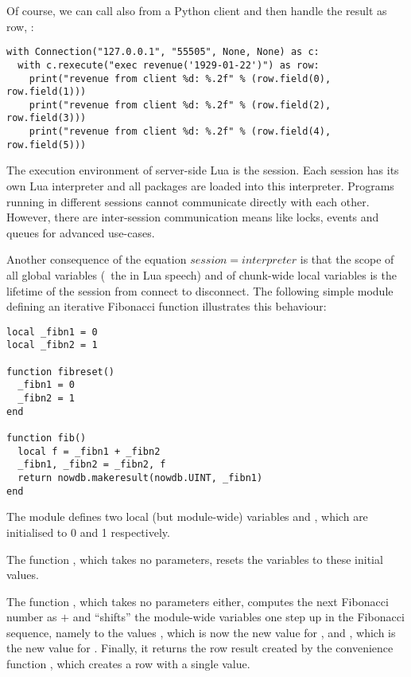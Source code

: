 \begin{minipage}{\textwidth}
Of course, we can call 
also from a Python client and then handle
the result as row, \eg:

\begin{python}
\begin{lstlisting}
with Connection("127.0.0.1", "55505", None, None) as c:
  with c.rexecute("exec revenue('1929-01-22')") as row:
    print("revenue from client %d: %.2f" % (row.field(0), row.field(1)))
    print("revenue from client %d: %.2f" % (row.field(2), row.field(3)))
    print("revenue from client %d: %.2f" % (row.field(4), row.field(5)))
\end{lstlisting}
\end{python}
\end{minipage}

The execution environment of server-side Lua
is the session. Each session has its own
Lua interpreter and all packages are loaded
into this interpreter. Programs running
in different sessions cannot communicate
directly with each other.
However, there are inter-session
communication means like locks, events and
queues for advanced use-cases.

Another consequence of the equation
$session = interpreter$ is that the scope
of all global variables (\ie\ the 
in Lua speech) and of chunk-wide local
variables is the lifetime of the session
from connect to disconnect.
The following simple module defining an iterative
Fibonacci function illustrates this behaviour:

\begin{lua}
\begin{lstlisting}
local _fibn1 = 0
local _fibn2 = 1

function fibreset()
  _fibn1 = 0
  _fibn2 = 1
end

function fib()
  local f = _fibn1 + _fibn2
  _fibn1, _fibn2 = _fibn2, f
  return nowdb.makeresult(nowdb.UINT, _fibn1)
end
\end{lstlisting}
\end{lua}

The module defines two local (but module-wide)
variables  and ,
which are initialised to 0 and 1 respectively.

The function , which takes no
parameters, resets the variables to these
initial values.

The function , which takes no parameters either,
computes the next Fibonacci number as
 $+$  and
``shifts'' the module-wide variables one step
up in the Fibonacci sequence, namely to
the values , which is now
the new value for , and ,
which is the new value for .
Finally, it returns the row result created by
the convenience function ,
which creates a row with a single value.


